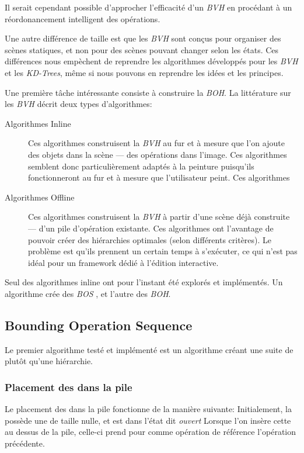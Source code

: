 		Il serait cependant possible d'approcher l'efficacité d'un \emph{BVH} en procédant à un réordonancement intelligent
		des opérations. 
		
		Une autre différence de taille est que les \emph{BVH} sont conçus pour organiser des scènes statiques,
		et non pour des scènes pouvant changer selon les états. Ces différences nous empèchent de reprendre 
		les algorithmes développés pour les \emph{BVH} et les \emph{KD-Trees}, 
		même si nous pouvons en reprendre les idées et les principes. 

		Une première tâche intéressante consiste à construire la \emph{BOH}. La littérature sur les \emph{BVH}
		décrit deux types d'algorithmes:
		\begin{description}
			\item[Algorithmes Inline] Ces algorithmes construisent la \emph{BVH} au fur et à mesure
			que l'on ajoute des objets dans la scène --- des opérations dans l'image. Ces algorithmes 
			semblent donc particulièrement adaptés à la peinture puisqu'ils fonctionneront au fur et à mesure que l'utilisateur
			peint. Ces algorithmes 
			\item[Algorithmes Offline] Ces algorithmes construisent la \emph{BVH} à partir d'une 
			scène déjà construite --- d'un pile d'opération existante. Ces algorithmes ont l'avantage de pouvoir
			créer des hiérarchies optimales (selon différents critères). Le problème est qu'ils prennent un certain temps 
			à s'exécuter, ce qui n'est pas idéal pour un framework dédié à l'édition interactive. 
		\end{description}
		Seul des algorithmes inline ont pour l'instant été explorés et implémentés. Un algorithme crée des \emph{BOS} ,
		et l'autre des \emph{BOH}. 
		
		\subsection{Bounding Operation Sequence}
			Le premier algorithme testé et implémenté est un algorithme créant une suite de \BO plutôt
			qu'une hiérarchie.
			
			\subsubsection{Placement des \BO dans la pile}
			Le placement des \BO dans la pile fonctionne de la manière suivante: Initialement, la \BO possède une \BB
			de taille nulle, et est dans l'état dit \emph{ouvert} Lorsque l'on insère cette \BO au dessus de la pile, 
			celle-ci prend pour comme opération de référence l'opération précédente. 


